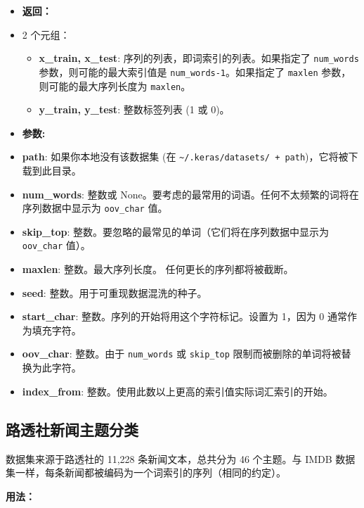 \begin{itemize}
\tightlist
\item
  \textbf{返回：}
\item
  2 个元组：

  \begin{itemize}
  \tightlist
  \item
    \textbf{x\_train, x\_test}: 序列的列表，即词索引的列表。如果指定了
    \texttt{num\_words} 参数，则可能的最大索引值是
    \texttt{num\_words-1}。如果指定了 \texttt{maxlen}
    参数，则可能的最大序列长度为 \texttt{maxlen}。
  \item
    \textbf{y\_train, y\_test}: 整数标签列表 (1 或 0)。
  \end{itemize}
\item
  \textbf{参数:}
\item
  \textbf{path}: 如果你本地没有该数据集 (在
  \texttt{\textquotesingle{}\textasciitilde{}/.keras/datasets/\textquotesingle{}\ +\ path})，它将被下载到此目录。
\item
  \textbf{num\_words}: 整数或
  None。要考虑的最常用的词语。任何不太频繁的词将在序列数据中显示为
  \texttt{oov\_char} 值。
\item
  \textbf{skip\_top}:
  整数。要忽略的最常见的单词（它们将在序列数据中显示为
  \texttt{oov\_char} 值）。
\item
  \textbf{maxlen}: 整数。最大序列长度。 任何更长的序列都将被截断。
\item
  \textbf{seed}: 整数。用于可重现数据混洗的种子。
\item
  \textbf{start\_char}: 整数。序列的开始将用这个字符标记。设置为 1，因为
  0 通常作为填充字符。
\item
  \textbf{oov\_char}: 整数。由于 \texttt{num\_words} 或
  \texttt{skip\_top} 限制而被删除的单词将被替换为此字符。
\item
  \textbf{index\_from}:
  整数。使用此数以上更高的索引值实际词汇索引的开始。
\end{itemize}


\subsection{路透社新闻主题分类}\label{ux8defux900fux793eux65b0ux95fbux4e3bux9898ux5206ux7c7b}

数据集来源于路透社的 11,228 条新闻文本，总共分为 46 个主题。与 IMDB
数据集一样，每条新闻都被编码为一个词索引的序列（相同的约定）。

\textbf{用法：}\label{ux7528ux6cd5-3}


